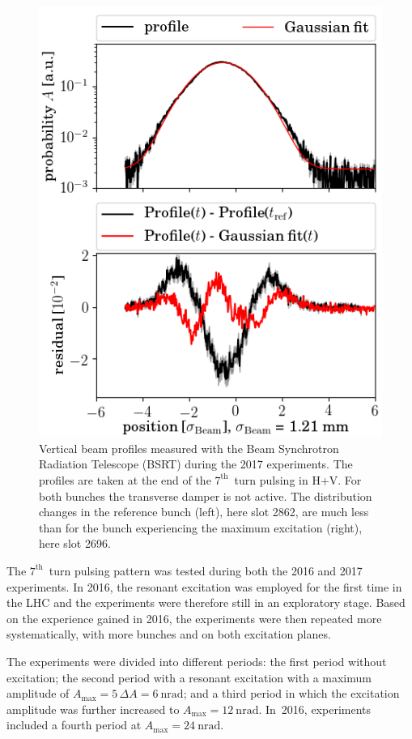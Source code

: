\documentclass[%
 reprint,
 amsmath,amssymb,
 aps,
prstab,
longbibliography
]{revtex4-1}
\newcommand{\q}[2]{\ensuremath{#1\ \mathrm{#2}}} %
\begin{document}
\begin{figure}
\begin{minipage}[t]{0.49\linewidth}
		\includegraphics[width=1.0\linewidth]{profile_v_7thhv_slot_2696.png}
	\end{minipage}
	\caption{\label{fig:7thexpprof} Vertical beam profiles measured with the Beam Synchrotron Radiation Telescope (BSRT) during the 2017 experiments. The profiles are taken at the end of the $7^{\mathrm{th}}$~turn pulsing in H+V. For both bunches the transverse damper is not active. The distribution changes in the reference bunch (left), here slot 2862, are much less than for the bunch experiencing the maximum excitation (right), here slot 2696.}
\end{figure}

The $7^{\mathrm{th}}$~turn pulsing pattern was tested during both the
2016 and 2017 experiments. In 2016, the resonant excitation was
employed for the first time in the LHC and the experiments were
therefore still in an exploratory stage. Based on the experience
gained in 2016, the experiments were then repeated more
systematically, with more bunches and on both excitation planes.

The experiments were divided into different periods: the first period
without excitation; the second period with a resonant excitation with
a maximum amplitude of
$A_{\mathrm{max}} = 5 \, \Delta A = \q{6}{nrad}$; and a third period
in which the excitation amplitude was further increased to
$A_{\mathrm{max}} = \q{12}{nrad}$. In~2016, experiments included a
fourth period at $A_{\mathrm{max}} = \q{24}{nrad}$.
\end{document}
